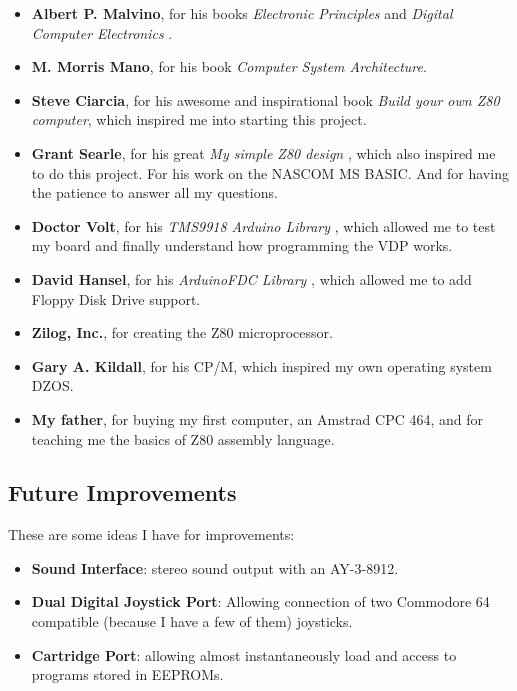 \documentclass[a4paper,11pt]{article}
\begin{document}
    \begin{itemize}
        \item \textbf{Albert P. Malvino}, for his books \textit{Electronic
        Principles}\cite{malvino1} and \textit{Digital Computer Electronics}
        \cite{malvino2}.
        \item \textbf{M. Morris Mano}, for his book \textit{Computer System
        Architecture}\cite{morrismano1}.
        \item \textbf{Steve Ciarcia}, for his awesome and inspirational book
        \textit{Build your own Z80 computer}\cite{ciarcia1}, which inspired me
        into starting this project.
        \item \textbf{Grant Searle}, for his great \textit{My simple Z80 design}
        \cite{searle1}, which also inspired me to do this project. For his work
        on the NASCOM MS BASIC. And for having the patience to answer all my
        questions.
        \item \textbf{Doctor Volt}, for his \textit{TMS9918 Arduino Library}
        \cite{drvolt}, which allowed me to test my board and finally
        understand how programming the VDP works.
        \item \textbf{David Hansel}, for his \textit{ArduinoFDC Library}
        \cite{dhansel}, which allowed me to add Floppy Disk Drive support.
        \item \textbf{Zilog, Inc.}, for creating the Z80 microprocessor.
        \item \textbf{Gary A. Kildall}, for his CP/M, which inspired my own
        operating system DZOS.
        \item \textbf{My father}, for buying my first computer, an Amstrad CPC
        464, and for teaching me the basics of Z80 assembly language.
    \end{itemize}

    \subsection{Future Improvements}

    These are some ideas I have for improvements:

    \begin{itemize}
        \item \textbf{Sound Interface}: stereo sound output with an AY-3-8912.
        \item \textbf{Dual Digital Joystick Port}: Allowing connection of two
        Commodore 64 compatible (because I have a few of them) joysticks.
        \item \textbf{Cartridge Port}: allowing almost instantaneously load and
        access to programs stored in EEPROMs.
    \end{itemize}

    \pagebreak
    
    
\end{document}
